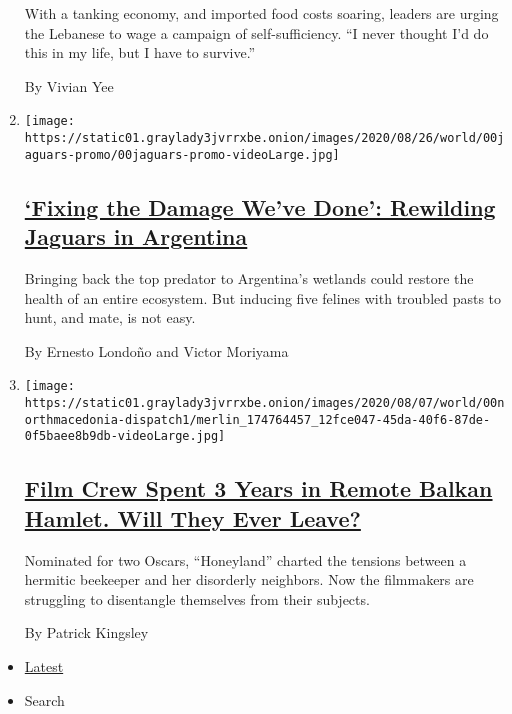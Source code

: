 \begin{enumerate}
  With a tanking economy, and imported food costs soaring, leaders are
  urging the Lebanese to wage a campaign of self-sufficiency. ``I never
  thought I'd do this in my life, but I have to survive.''

  By Vivian Yee
\item
  \texttt{[image: https://static01.graylady3jvrrxbe.onion/images/2020/08/26/world/00jaguars-promo/00jaguars-promo-videoLarge.jpg]}

  \hypertarget{fixing-the-damage-weve-done-rewilding-jaguars-in-argentina}{%
  \subsection{\texorpdfstring{\href{/2020/09/01/world/americas/Jaguars-argentina-ibera.html}{`Fixing
  the Damage We've Done': Rewilding Jaguars in
  Argentina}}{`Fixing the Damage We've Done': Rewilding Jaguars in Argentina}}\label{fixing-the-damage-weve-done-rewilding-jaguars-in-argentina}}

  Bringing back the top predator to Argentina's wetlands could restore
  the health of an entire ecosystem. But inducing five felines with
  troubled pasts to hunt, and mate, is not easy.

  By Ernesto Londoño and Victor Moriyama
\item
  \texttt{[image: https://static01.graylady3jvrrxbe.onion/images/2020/08/07/world/00northmacedonia-dispatch1/merlin\_174764457\_12fce047-45da-40f6-87de-0f5baee8b9db-videoLarge.jpg]}

  \hypertarget{film-crew-spent-3-years-in-remote-balkan-hamlet-will-they-ever-leave}{%
  \subsection{\texorpdfstring{\href{/2020/08/29/world/europe/honeyland-north-macedonia-bees.html}{Film
  Crew Spent 3 Years in Remote Balkan Hamlet. Will They Ever
  Leave?}}{Film Crew Spent 3 Years in Remote Balkan Hamlet. Will They Ever Leave?}}\label{film-crew-spent-3-years-in-remote-balkan-hamlet-will-they-ever-leave}}

  Nominated for two Oscars, ``Honeyland'' charted the tensions between a
  hermitic beekeeper and her disorderly neighbors. Now the filmmakers
  are struggling to disentangle themselves from their subjects.

  By Patrick Kingsley
\end{enumerate}

\begin{itemize}
\tightlist
\item
  \protect\hyperlink{stream-panel}{Latest}
\item
  Search
\end{itemize}

